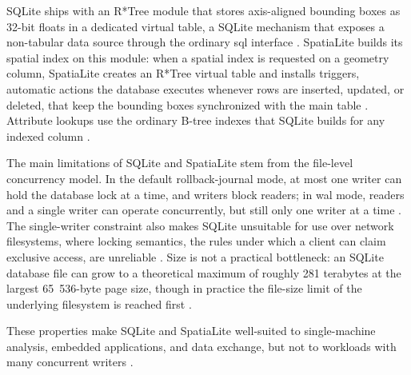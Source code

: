 SQLite ships with an R*Tree module that stores axis-aligned bounding boxes as 32-bit floats in a dedicated virtual table, a SQLite mechanism that exposes a non-tabular data source through the ordinary \acrshort{sql} interface \parencite{sqlite2024_rtree_module}. SpatiaLite builds its spatial index on this module: when a spatial index is requested on a geometry column, SpatiaLite creates an R*Tree virtual table and installs triggers, automatic actions the database executes whenever rows are inserted, updated, or deleted, that keep the bounding boxes synchronized with the main table \parencite{gaia2011_rtree_cookbook}. Attribute lookups use the ordinary B-tree indexes that SQLite builds for any indexed column \parencite{sqlite2024_fileformat}.

The main limitations of SQLite and SpatiaLite stem from the file-level concurrency model. In the default rollback-journal mode, at most one writer can hold the database lock at a time, and writers block readers; in \acrshort{wal} mode, readers and a single writer can operate concurrently, but still only one writer at a time \parencite{sqlite2024_wal}. The single-writer constraint also makes SQLite unsuitable for use over network filesystems, where locking semantics, the rules under which a client can claim exclusive access, are unreliable \parencite{sqlite2024_appropriate_uses}. Size is not a practical bottleneck: an SQLite database file can grow to a theoretical maximum of roughly 281 terabytes at the largest 65~536-byte page size, though in practice the file-size limit of the underlying filesystem is reached first \parencite{sqlite2024_limits}.

These properties make SQLite and SpatiaLite well-suited to single-machine analysis, embedded applications, and data exchange, but not to workloads with many concurrent writers \parencite{sqlite2024_appropriate_uses}.


